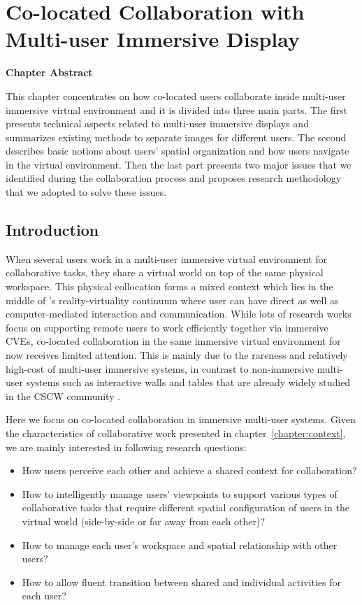 \chapter{Co-located Collaboration with Multi-user Immersive Display}
\label{chapter:colocated_colab}
\pagebreak

\textbf{Chapter Abstract}

This chapter concentrates on how co-located users collaborate inside multi-user immersive virtual environment and it is divided into three main parts. The first presents technical aspects related to multi-user immersive displays and summarizes existing methods to separate images for different users. The second describes basic notions about users' spatial organization and how users navigate in the virtual environment. Then the last part presents two major issues that we identified during the collaboration process and proposes research methodology that we adopted to solve these issues.

\vspace*{2\baselineskip}

\minitoc

\newpage
\section{Introduction}
When several users work in a multi-user immersive virtual environment for collaborative tasks, they share a virtual world on top of the same physical workspace. This physical collocation forms a mixed context which lies in the middle of \citet{Milgram1995AR}'s reality-virtuality continuum where user can have direct as well as computer-mediated interaction and communication. While lots of research works focus on supporting remote users to work efficiently together via immersive CVEs, co-located collaboration in the same immersive virtual environment for now receives limited attention. This is mainly due to the rareness and relatively high-cost of multi-user immersive systems, in contrast to non-immersive multi-user systems such as interactive walls and tables that are already widely studied in the CSCW community \citep{Scott2003System, Inkpen2005Exploring}.

Here we focus on co-located collaboration in immersive multi-user systems. Given the characteristics of collaborative work presented in chapter~\ref{chapter:context}, we are mainly interested in following research questions:

\begin{itemize}
\item How users perceive each other and achieve a shared context for collaboration?
\item How to intelligently manage users' viewpoints to support various types of collaborative tasks that require different spatial configuration of users in the virtual world (side-by-side or far away from each other)?
\item How to manage each user's workspace and spatial relationship with other users?
\item How to allow fluent transition between shared and individual activities for each user?
\end{itemize}


